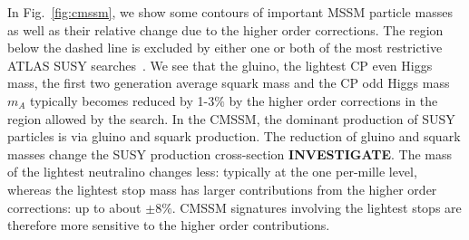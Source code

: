 \documentclass[final,3p,times,pdflatex]{elsarticle}
\begin{document}
In Fig.~\ref{fig:cmssm}, we show some contours of important MSSM particle
masses as 
well as their relative change due to the higher order corrections. The region
below the dashed line is excluded by either one or both of the most
restrictive ATLAS SUSY searches~\cite{ATLAS-CONF-2013-047,Aad:2013wta}. 
We see that the gluino, the lightest CP even Higgs mass, the first two
generation average squark mass and
the CP odd Higgs mass $m_A$ typically becomes reduced by
1-3$\%$ by the higher order corrections in the region allowed by the search. 
In the CMSSM, the dominant production of SUSY particles is via gluino and 
squark production. The reduction of gluino and squark masses change the SUSY
production cross-section {\bf INVESTIGATE}.
The mass of the lightest neutralino changes less: typically at the one
per-mille level, whereas the lightest stop mass has larger contributions from
the higher order corrections: up to about $\pm 8\%$. CMSSM signatures involving
the lightest stops are therefore more sensitive to the higher order
contributions. 
\end{document}
